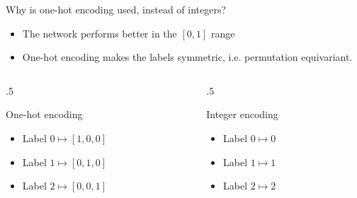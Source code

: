\documentclass[xcolor=pdftex,dvipsnames,table,mathserif,aspectratio=169]{beamer}
\begin{document}
\begin{frame}{}

\begin{quizzblock}{Why is one-hot encoding used, instead of integers?}
  \begin{itemize}
  \item[1/ ] The network performs better in the $[0,1]$ range
  \item[2/ ] One-hot encoding makes the labels symmetric, i.e. permutation equivariant.
  \end{itemize}
\end{quizzblock}

  \vspace{1em}

  \begin{columns}
    \begin{column}{.5\textwidth}
  \begin{block}{One-hot encoding}
    \begin{itemize}
    \item
      Label $0 \longmapsto [1,0,0]$
    \item
      Label $1 \longmapsto [0,1,0]$
    \item
      Label $2 \longmapsto [0,0,1]$
    \end{itemize}
  \end{block}

    \end{column}

    \begin{column}{.5\textwidth}
  \begin{block}{Integer encoding}
    \begin{itemize}
    \item
      Label $0 \longmapsto 0$
    \item
      Label $1 \longmapsto 1$
    \item
      Label $2 \longmapsto 2$
    \end{itemize}
  \end{block}

    \end{column}
  \end{columns}

  \pause

  \vspace{1em}


\end{frame}
\end{document}
